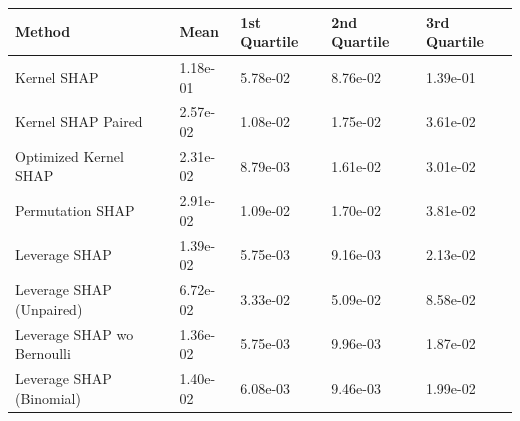 \begin{tabular}{lllll}
  \toprule
  \textbf{Method} & \textbf{Mean} & \textbf{1st Quartile} & \textbf{2nd Quartile} & \textbf{3rd Quartile} \\ \midrule
Kernel SHAP & 1.18e-01 & 5.78e-02 & 8.76e-02 & 1.39e-01\\
Kernel SHAP Paired & 2.57e-02 & 1.08e-02 & 1.75e-02 & 3.61e-02\\
Optimized Kernel SHAP & 2.31e-02 & 8.79e-03 & 1.61e-02 & 3.01e-02\\
Permutation SHAP & 2.91e-02 & 1.09e-02 & 1.70e-02 & 3.81e-02\\
Leverage SHAP & \cellcolor{silver!60}1.39e-02 & \cellcolor{gold!60}5.75e-03 & \cellcolor{gold!60}9.16e-03 & \cellcolor{bronze!60}2.13e-02\\
Leverage SHAP (Unpaired) & 6.72e-02 & 3.33e-02 & 5.09e-02 & 8.58e-02\\
Leverage SHAP wo Bernoulli & \cellcolor{gold!60}1.36e-02 & \cellcolor{gold!60}5.75e-03 & \cellcolor{bronze!60}9.96e-03 & \cellcolor{gold!60}1.87e-02\\
Leverage SHAP (Binomial) & \cellcolor{bronze!60}1.40e-02 & \cellcolor{bronze!60}6.08e-03 & \cellcolor{silver!60}9.46e-03 & \cellcolor{silver!60}1.99e-02\\
\bottomrule
\end{tabular}
